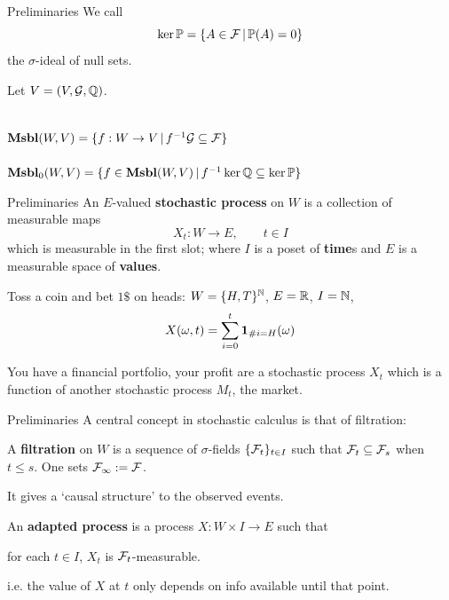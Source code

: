 \begin{frame}{Preliminaries}
	We call
	\begin{equation*}
		\ker \mathbb{P} = \{A \in \mathcal{F} \,|\, \mathbb{P}(A) = 0 \}
	\end{equation*}
	the $\sigma$-ideal of null sets.

	Let $V = (V, \mathcal{G}, \mathbb{Q})$.
	\begin{center}
		\\
		$\mathbf{Msbl}(W, V) = \{ f : W \to V \,|\, f^{-1}\mathcal{G} \subseteq \mathcal{F}\}$\\[2ex]

		\\
		$\mathbf{Msbl}_0(W, V) = \{ f \in \mathbf{Msbl}(W, V) \,|\, f^{-1}\ker\mathbb{Q} \subseteq \ker \mathbb{P}\}$
	\end{center}
\end{frame}

\begin{frame}{Preliminaries}
	An $E$-valued \textbf{stochastic process} on $W$ is a collection of measurable maps
	\begin{equation*}
		X_t : W \to E, \qquad t \in I
	\end{equation*}
	which is measurable in the first slot; where $I$ is a poset of \textbf{time}s and $E$ is a measurable space of \textbf{values}.

	\begin{example}
		Toss a coin and bet $1\$$ on heads: $W = \{H,T\}^{\mathbb{N}}$, $E = \mathbb{R}$, $I = \mathbb{N}$,
		\begin{equation*}
			X(\omega, t) = \sum_{i=0}^t {\boldsymbol{1}}_{\#i = H}(\omega)
		\end{equation*}
	\end{example}
	\begin{example}
		You have a financial portfolio, your profit are a stochastic process $X_t$ which is a function of another stochastic process $M_t$, the market.
	\end{example}
\end{frame}

\begin{frame}{Preliminaries}
	A central concept in stochastic calculus is that of filtration:
	\begin{definition}
		A \textbf{filtration} on $W$ is a sequence of $\sigma$-fields $\{\mathcal{F}_t\}_{t \in I}$ such that $\mathcal{F}_t \subseteq \mathcal{F}_s$ when $t \leq s$. One sets $\mathcal{F}_\infty := \mathcal{F}$.
	\end{definition}

	\vfill
	It gives a `causal structure' to the observed events.

	\vfill
	\begin{definition}
		An \textbf{adapted process} is a process $X : W \times I \to E$ such that
		\begin{center}
			for each $t \in I$, $X_t$ is $\mathcal{F}_t$-measurable.
		\end{center}
	\end{definition}
	i.e. the value of $X$ at $t$ only depends on info available until that point.
\end{frame}

